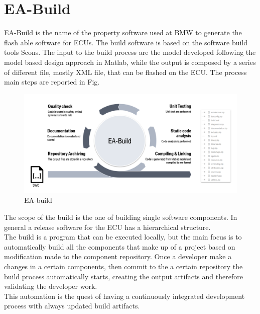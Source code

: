 \documentclass[../main.tex]{subfiles}
\begin{document}
\section{EA-Build}
\label{sec:EA-buildsection}
EA-Build is the name of the property software used at BMW to generate the flash able software for ECUs. The build software is based on the software build tools Scons. The input to the build process are the model developed following the model based design approach in Matlab, while the output is composed by a series of different file, mostly XML file, that can be flashed on the \gls{ECU}. The process main steps are reported in Fig.
\begin{figure}[h]
    \centering
    \includegraphics[width=\linewidth]{images_folder/build_proc.png}
    \caption{EA-build}
    \label{fig:eabuild}
\end{figure}
The scope of the build is the one of building single software components. In general a release software for the \gls{ECU} has a hierarchical structure.\\
The build is a program that can be executed locally, but the main focus is to automatically build all the components that make up of a project based on modification made to the component repository. Once a developer make a changes in a certain components, then commit to the a certain repository the build process automatically starts, creating the output artifacts and therefore validating the developer work. \\
This automation is the quest of having a continuously integrated development process with always updated build artifacts. 
\cleardoublepage
\end{document}
